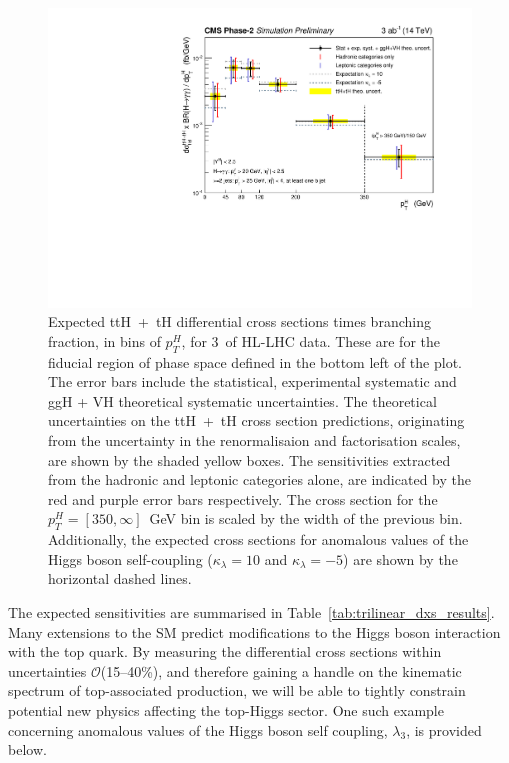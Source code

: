 \begin{figure}[htb!]
  \centering
  \includegraphics[width=.8\textwidth]{Figures/cms/trilinear/CMS-PAS-FTR-18-020_Figure_006.pdf}
  \caption[Expected top-associated differential $p_T^H$ cross section measurements at the HL-LHC]
  {
    Expected ttH~+~tH differential cross sections times branching fraction, in bins of $p_T^H$, for 3~\abinv of HL-LHC data. These are for the fiducial region of phase space defined in the bottom left of the plot. The error bars include the statistical, experimental systematic and ggH + VH theoretical systematic uncertainties. The theoretical uncertainties on the ttH~+~tH cross section predictions, originating from the uncertainty in the renormalisaion and factorisation scales, are shown by the shaded yellow boxes. The sensitivities extracted from the hadronic and leptonic categories alone, are indicated by the red and purple error bars respectively. The cross section for the $p_T^H=[350,\infty]$~GeV bin is scaled by the width of the previous bin. Additionally, the expected cross sections for anomalous values of the Higgs boson self-coupling ($\kappa_\lambda=10$ and $\kappa_\lambda=-5$) are shown by the horizontal dashed lines.
  }
  \label{fig:trilinear_dxs}
\end{figure}

The expected sensitivities are summarised in Table~\ref{tab:trilinear_dxs_results}. Many extensions to the SM predict modifications to the Higgs boson interaction with the top quark. By measuring the differential cross sections within uncertainties $\mathcal{O}$(15--40\%), and therefore gaining a handle on the kinematic spectrum of top-associated production, we will be able to tightly constrain potential new physics affecting the top-Higgs sector. One such example concerning anomalous values of the Higgs boson self coupling, $\lambda_3$, is provided below.

